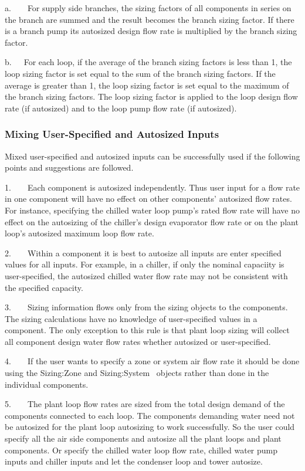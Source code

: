 a.~~~~For supply side branches, the sizing factors of all components in series on the branch are summed and the result becomes the branch sizing factor. If there is a branch pump its autosized design flow rate is multiplied by the branch sizing factor.

b.~~~For each loop, if the average of the branch sizing factors is less than 1, the loop sizing factor is set equal to the sum of the branch sizing factors. If the average is greater than 1, the loop sizing factor is set equal to the maximum of the branch sizing factors. The loop sizing factor is applied to the loop design flow rate (if autosized) and to the loop pump flow rate (if autosized).

\subsubsection{Mixing User-Specified and Autosized Inputs}\label{mixing-user-specified-and-autosized-inputs}

Mixed user-specified and autosized inputs can be successfully used if the following points and suggestions are followed.

1.~~~~Each component is autosized independently. Thus user input for a flow rate in one component will have no effect on other components' autosized flow rates. For instance, specifying the chilled water loop pump's rated flow rate will have no effect on the autosizing of the chiller's design evaporator flow rate or on the plant loop's autosized maximum loop flow rate.

2.~~~~Within a component it is best to autosize all inputs are enter specified values for all inputs. For example, in a chiller, if only the nominal capaciity is user-specified, the autosized chilled water flow rate may not be consistent with the specified capacity.

3.~~~~Sizing information flows only from the sizing objects to the components. The sizing calculations have no knowledge of user-specified values in a component. The only exception to this rule is that plant loop sizing will collect all component design water flow rates whether autosized or user-specified.

4.~~~~If the user wants to specify a zone or system air flow rate it should be done using the Sizing:Zone and Sizing:System~ objects rather than done in the individual components.

5.~~~~The plant loop flow rates are sized from the total design demand of the components connected to each loop. The components demanding water need not be autosized for the plant loop autosizing to work successfully. So the user could specify all the air side components and autosize all the plant loops and plant components. Or specify the chilled water loop flow rate, chilled water pump inputs and chiller inputs and let the condenser loop and tower autosize.

